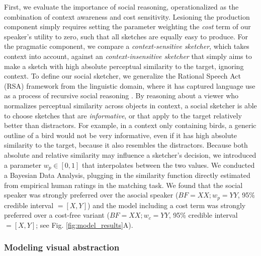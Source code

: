 \documentclass[9pt,twocolumn,twoside]{pnas-new}
\begin{document}
First, we evaluate the importance of social reasoning, operationalized as the combination of context awareness and cost sensitivity.  
Lesioning the production component simply requires setting the parameter weighting the \emph{cost} term of our speaker's utility to zero, such that all sketches are equally easy to produce. For the pragmatic component, we compare a \emph{context-sensitive sketcher}, which takes context into account, against an \emph{context-insensitive sketcher} that simply aims to make a sketch with high absolute perceptual similarity to the target, ignoring context. To define our social sketcher, we generalize the Rational Speech Act (RSA) framework from the linguistic domain, where it has captured language use as a process of recursive social reasoning \cite{goodman2016pragmatic,kao2014formalizing,goodman2013knowledge}. By reasoning about a viewer who normalizes perceptual similarity across objects in context, a social sketcher is able to choose sketches that are \emph{informative}, or that apply to the target relatively better than distractors. For example, in a context only containing birds, a generic outline of a bird would not be very informative, even if it has high absolute similarity to the target, because it also resembles the distractors. Because both absolute and relative similarity may influence a sketcher's decision, we introduced a parameter $w_p \in [0,1]$ that interpolates between the two values. We conducted a Bayesian Data Analysis, plugging in the similarity function directly estimated from empirical human ratings in the matching task. We found that the social speaker was strongly preferred over the asocial speaker ($BF = XX; w_p = YY$, 95\% credible interval $= [X, Y]$) and the model including a cost term was strongly preferred over a cost-free variant ($BF = XX; w_c = YY$, 95\% credible interval $=[X, Y]$; see Fig. \ref{fig:model_results}A).



\subsubsection*{Modeling visual abstraction}
\end{document}
